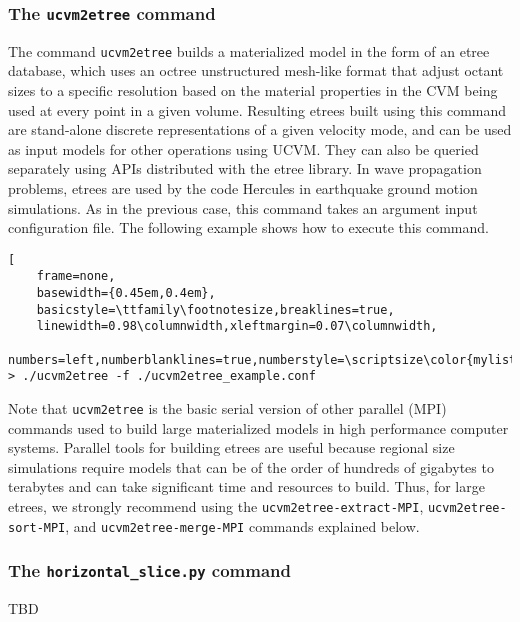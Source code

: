 \subsubsection{The \textup{\texttt{ucvm2etree}} command}

The command \texttt{ucvm2etree} builds a materialized model in the form of an etree database, which uses an octree unstructured mesh-like format that adjust octant sizes to a specific resolution based on the material properties in the CVM being used at every point in a given volume. Resulting etrees built using this command are stand-alone discrete representations of a given velocity mode, and can be used as input models for other operations using UCVM. They can also be queried separately using APIs distributed with the etree library. In wave propagation problems, etrees are used by the code Hercules \citep{Tu_2006_SC, Taborda_2010_Tech} in earthquake ground motion simulations. As in the previous case, this command takes an argument input configuration file. The following example shows how to execute this command.

\begin{lstlisting}[
	frame=none,
	basewidth={0.45em,0.4em},
	basicstyle=\ttfamily\footnotesize,breaklines=true,
	linewidth=0.98\columnwidth,xleftmargin=0.07\columnwidth,
	numbers=left,numberblanklines=true,numberstyle=\scriptsize\color{mylistingnclr}]
> ./ucvm2etree -f ./ucvm2etree_example.conf
\end{lstlisting}

Note that \texttt{ucvm2etree} is the basic serial version of other parallel (MPI) commands used to build large materialized models in high performance computer systems. Parallel tools for building etrees are useful because regional size simulations require models that can be of the order of hundreds of gigabytes to terabytes and can take significant time and resources to build. Thus, for large etrees, we strongly recommend using the \texttt{ucvm2etree-extract-MPI}, \texttt{ucvm2etree-sort-MPI}, and \texttt{ucvm2etree-merge-MPI} commands explained below.


\subsubsection{The \textup{\texttt{horizontal\_slice.py}} command}

TBD
